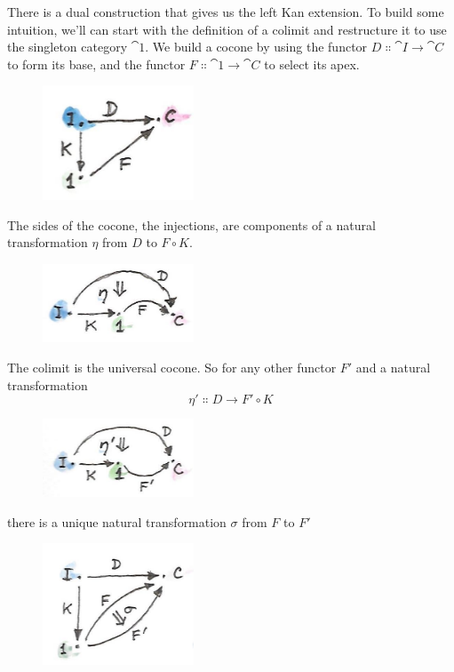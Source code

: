 There is a dual construction that gives us the left Kan extension. To
build some intuition, we'll can start with the definition of a colimit
and restructure it to use the singleton category $\cat{1}$. We build a
cocone by using the functor $D \Colon \cat{I} \to \cat{C}$ to form its
base, and the functor $F \Colon \cat{1} \to \cat{C}$ to select its apex.

\begin{figure}[H]
  \centering
  \includegraphics[width=0.4\textwidth]{images/kan81.jpg}
\end{figure}

\noindent
The sides of the cocone, the injections, are components of a natural
transformation $\eta$ from $D$ to $F \circ K$.

\begin{figure}[H]
  \centering
  \includegraphics[width=0.4\textwidth]{images/kan10a.jpg}
\end{figure}

\noindent
The colimit is the universal cocone. So for any other functor
$F'$ and a natural transformation
\[\eta' \Colon D \to F' \circ K\]

\begin{figure}[H]
  \centering
  \includegraphics[width=0.4\textwidth]{images/kan10b.jpg}
\end{figure}

\noindent
there is a unique natural transformation $\sigma$ from $F$ to $F'$

\begin{figure}[H]
  \centering
  \includegraphics[width=0.4\textwidth]{images/kan14.jpg}
\end{figure}

